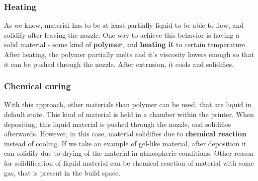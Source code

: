 \documentclass[a4paper, twoside, 11pt]{report}
\begin{document}
\subsubsection{Heating}
As we know, material has to be at least partially liquid to be able to flow, and solidify after leaving the nozzle. One way to achieve this behavior is having a solid material - some kind of \textbf{polymer}, and \textbf{heating it} to certain temperature. After heating, the polymer partially melts and it's viscosity lowers enough so that it can be pushed through the nozzle. After extrusion, it cools and solidifies.\\
\subsubsection{Chemical curing}
With this approach, other materials than polymer can be used, that are liquid in default state. This kind of material is held in a chamber within the printer. When depositing, this liquid material is pushed through the nozzle, and solidifies afterwards. However, in this case, material solidifies due to \textbf{chemical reaction} instead of cooling. If we take an example of gel-like material, after deposition it can solidify due to drying of the material in atmospheric conditions. Other reason for solidification of liquid material can be chemical reaction of material with some gas, that is present in the build space.\\
\end{document}
